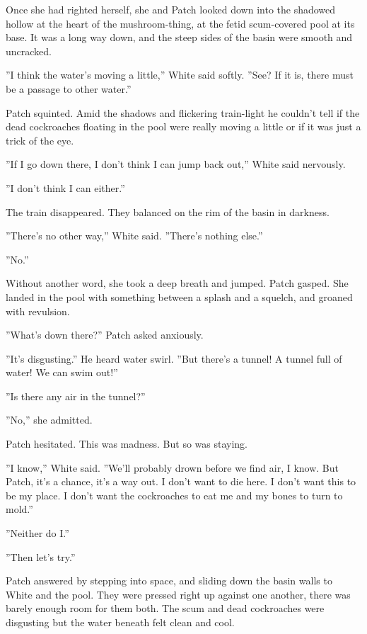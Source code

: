 \documentclass[11pt]{article}
\begin{document}
 Once she had righted herself, she and Patch looked down into the shadowed hollow at the heart of the mushroom-thing, at the fetid scum-covered pool at its base. It was a long way down, and the steep sides of the basin were smooth and uncracked.\par
 ''I think the water's moving a little,'' White said softly. ''See? If it is, there must be a passage to other water.''\par
 Patch squinted. Amid the shadows and flickering train-light he couldn't tell if the dead cockroaches floating in the pool were really moving a little or if it was just a trick of the eye.\par
 ''If I go down there, I don't think I can jump back out,'' White said nervously.\par
 ''I don't think I can either.''\par
 The train disappeared. They balanced on the rim of the basin in darkness.\par
 ''There's no other way,'' White said. ''There's nothing else.''\par
 ''No.''\par
 Without another word, she took a deep breath and jumped. Patch gasped. She landed in the pool with something between a splash and a squelch, and groaned with revulsion.\par
 ''What's down there?'' Patch asked anxiously.\par
 ''It's disgusting.'' He heard water swirl. ''But there's a tunnel! A tunnel full of water! We can swim out!''\par
 ''Is there any air in the tunnel?''\par
 ''No,'' she admitted.\par
 Patch hesitated. This was madness. But so was staying.\par
 ''I know,'' White said. ''We'll probably drown before we find air, I know. But Patch, it's a chance, it's a way out. I don't want to die here. I don't want this to be my place. I don't want the cockroaches to eat me and my bones to turn to mold.''\par
 ''Neither do I.''\par
 ''Then let's try.''\par
 Patch answered by stepping into space, and sliding down the basin walls to White and the pool. They were pressed right up against one another, there was barely enough room for them both. The scum and dead cockroaches were disgusting %
 but the water beneath felt clean and cool.\par
\end{document}
